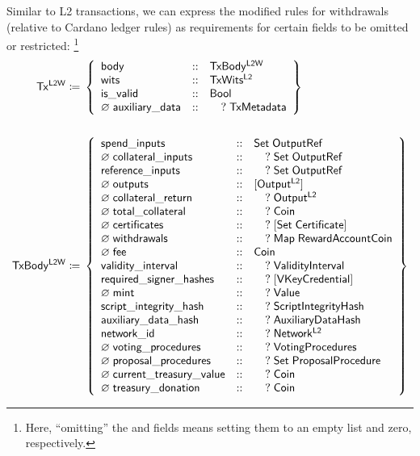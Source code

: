 \documentclass[../hydrozoa.tex]{subfiles}
\begin{document}
Similar to L2 transactions, we can express the modified rules for withdrawals (relative to Cardano ledger rules) as requirements for certain fields to be omitted or restricted:%
\footnote{Here, ``omitting'' the  and  fields means setting them to an empty list and zero, respectively.}
\begingroup
\allowdisplaybreaks
\begin{align*}
  \mathsf{Tx^{L2W}} \coloneq\;& \left\{
    \begin{array}{lll}
      \mathsf{body} &::& \mathsf{TxBody^{L2W}} \\
        \mathsf{wits} &::& \mathsf{TxWits^{L2}} \\
        \mathsf{is\_valid} &::& \mathsf{Bool} \\
        \varnothing\;\mathsf{auxiliary\_data} &::& \quad?\;\mathsf{TxMetadata}
    \end{array} \right\} \\\\
    \mathsf{TxBody^{L2W}} \coloneq\;& \left\{
    \begin{array}{lll}
      \mathsf{spend\_inputs} &::& \mathsf{Set \; OutputRef} \\
        \varnothing\;\mathsf{collateral\_inputs} &::& \quad?\;\mathsf{Set \; OutputRef} \\
        \mathsf{reference\_inputs} &::& \quad?\;\mathsf{Set \; OutputRef} \\
        \varnothing\;\mathsf{outputs} &::& \mathsf{[Output^{L2}]} \\
        \varnothing\;\mathsf{collateral\_return} &::& \quad?\;\mathsf{Output^{L2}} \\
        \varnothing\;\mathsf{total\_collateral} &::& \quad?\;\mathsf{Coin} \\
        \varnothing\;\mathsf{certificates} &::& \quad?\;\mathsf{[ Set \; Certificate ]} \\
        \varnothing\;\mathsf{withdrawals} &::& \quad?\;\mathsf{Map \; RewardAccount Coin} \\
        \varnothing\;\mathsf{fee} &::& \mathsf{Coin} \\
        \mathsf{validity\_interval} &::& \quad?\;\mathsf{ValidityInterval} \\
        \mathsf{required\_signer\_hashes} &::& \quad?\;\mathsf{[VKeyCredential]} \\
        \varnothing\;\mathsf{mint} &::& \quad?\;\mathsf{Value} \\
        \mathsf{script\_integrity\_hash} &::& \quad?\;\mathsf{ScriptIntegrityHash} \\
        \mathsf{auxiliary\_data\_hash} &::& \quad?\;\mathsf{AuxiliaryDataHash} \\
        \mathsf{network\_id} &::& \quad?\;\mathsf{Network^{L2}} \\
        \varnothing\;\mathsf{voting\_procedures} &::& \quad?\;\mathsf{VotingProcedures} \\
        \varnothing\;\mathsf{proposal\_procedures} &::& \quad?\;\mathsf{Set \; ProposalProcedure} \\
        \varnothing\;\mathsf{current\_treasury\_value} &::& \quad?\;\mathsf{Coin} \\
        \varnothing\;\mathsf{treasury\_donation} &::& \quad?\;\mathsf{Coin}
    \end{array} \right\}
\end{align*}
\endgroup
\end{document}
